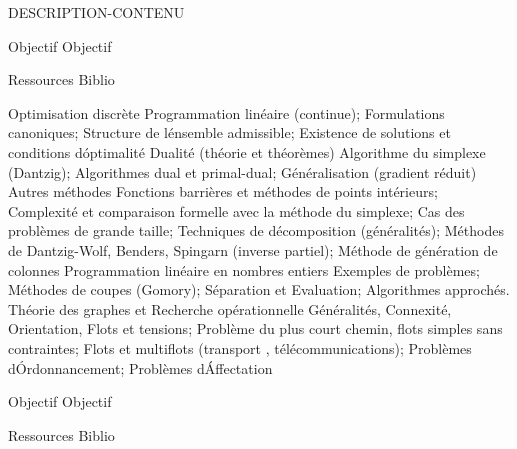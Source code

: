 \vfill

{
DESCRIPTION-CONTENU 
} 
{} 
{\begin{itemize}
\ObjItem Objectif 
\ObjItem Objectif
\end{itemize} 
} 
{Ressources} 
{Biblio} 
 
\vfill

{
Optimisation discrète 
Programmation linéaire (continue); Formulations canoniques; Structure de l\'ensemble admissible; Existence de solutions et conditions d\'optimalité
Dualité (théorie et théorèmes) 
Algorithme du simplexe (Dantzig); Algorithmes dual et primal-dual; Généralisation (gradient réduit) 
Autres méthodes
Fonctions barrières et méthodes de points intérieurs; Complexité et comparaison formelle avec la méthode du simplexe; Cas des problèmes de grande taille; 
Techniques de décomposition (généralités); Méthodes de Dantzig-Wolf, Benders, Spingarn (inverse partiel); Méthode de génération de colonnes  
Programmation linéaire en nombres entiers
Exemples de problèmes; Méthodes de coupes (Gomory); Séparation et Evaluation; Algorithmes approchés.
Théorie des graphes et Recherche opérationnelle
Généralités, Connexité, Orientation, Flots et tensions; Problème du plus court chemin, flots simples sans contraintes; Flots et multiflots (transport , télécommunications);  Problèmes d\'Ordonnancement; Problèmes d\'Affectation 
} 
{} 
{\begin{itemize}
\ObjItem Objectif 
\ObjItem Objectif
\end{itemize} 
} 
{Ressources} 
{Biblio} 
 
